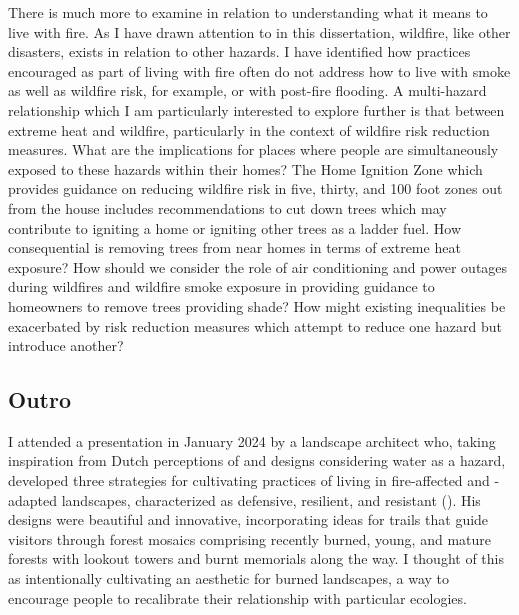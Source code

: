 \documentclass[
]{article}
\begin{document}
There is much more to examine in relation to understanding what it means to live with fire. As I have drawn attention to in this dissertation, wildfire, like other disasters, exists in relation to other hazards. I have identified how practices encouraged as part of living with fire often do not address how to live with smoke as well as wildfire risk, for example, or with post-fire flooding. A multi-hazard relationship which I am particularly interested to explore further is that between extreme heat and wildfire, particularly in the context of wildfire risk reduction measures. What are the implications for places where people are simultaneously exposed to these hazards within their homes? The Home Ignition Zone which provides guidance on reducing wildfire risk in five, thirty, and 100 foot zones out from the house includes recommendations to cut down trees which may contribute to igniting a home or igniting other trees as a ladder fuel. How consequential is removing trees from near homes in terms of extreme heat exposure? How should we consider the role of air conditioning and power outages during wildfires and wildfire smoke exposure in providing guidance to homeowners to remove trees providing shade? How might existing inequalities be exacerbated by risk reduction measures which attempt to reduce one hazard but introduce another?

\subsection{Outro}\label{outro}

I attended a presentation in January 2024 by a landscape architect who, taking inspiration from Dutch perceptions of and designs considering water as a hazard, developed three strategies for cultivating practices of living in fire-affected and -adapted landscapes, characterized as defensive, resilient, and resistant (). His designs were beautiful and innovative, incorporating ideas for trails that guide visitors through forest mosaics comprising recently burned, young, and mature forests with lookout towers and burnt memorials along the way. I thought of this as intentionally cultivating an aesthetic for burned landscapes, a way to encourage people to recalibrate their relationship with particular ecologies.
\end{document}
